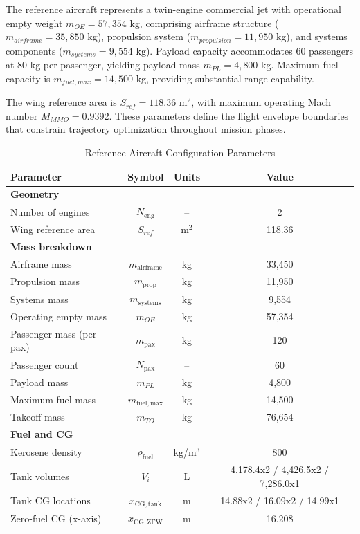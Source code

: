 
The reference aircraft represents a twin-engine commercial jet with operational empty weight $m_{OE} = 57,354$ kg, comprising airframe structure ($m_{airframe} = 35,850$ kg), propulsion system ($m_{propulsion} = 11,950$ kg), and systems components ($m_{systems} = 9,554$ kg). Payload capacity accommodates 60 passengers at 80 kg per passenger, yielding payload mass $m_{PL} = 4,800$ kg. Maximum fuel capacity is $m_{fuel,max} = 14,500$ kg, providing substantial range capability.

The wing reference area is $S_{ref} = 118.36$ m$^2$, with maximum operating Mach number $M_{MMO} = 0.9392$. These parameters define the flight envelope boundaries that constrain trajectory optimization throughout mission phases.

 \begin{table}[h]
    \centering
    \footnotesize
    \caption{Reference Aircraft Configuration Parameters}
    \begin{tabular}{l c c c}
        \hline
        Parameter & Symbol & Units & Value \\
        \hline
        \textbf{Geometry} & & & \\
        Number of engines & $N_{\mathrm{eng}}$ & -- & 2 \\
        Wing reference area & $S_{ref}$ & m$^2$ & 118.36 \\
        \hline
        \textbf{Mass breakdown} & & & \\
        Airframe mass & $m_{\mathrm{airframe}}$ & kg & 33{,}450 \\
        Propulsion mass & $m_{\mathrm{prop}}$ & kg & 11{,}950 \\
        Systems mass & $m_{\mathrm{systems}}$ & kg & 9{,}554 \\
        Operating empty mass & $m_{OE}$ & kg & 57{,}354 \\
        Passenger mass (per pax) & $m_{\mathrm{pax}}$ & kg & 120 \\
        Passenger count & $N_{\mathrm{pax}}$ & -- & 60 \\
        Payload mass & $m_{PL}$ & kg & 4{,}800 \\
        Maximum fuel mass & $m_{\mathrm{fuel,max}}$ & kg & 14{,}500 \\
        Takeoff mass & $m_{TO}$ & kg & 76{,}654 \\

        \hline
        \textbf{Fuel and CG} & & & \\
        Kerosene density & $\rho_{\mathrm{fuel}}$ & kg/m$^3$ & 800 \\
        Tank volumes & $V_{i}$ & L & 4{,}178.4x2 / 4{,}426.5x2 / 7{,}286.0x1 \\
        Tank CG locations & $x_{\mathrm{CG,tank}}$ & m & 14.88x2 / 16.09x2 / 14.99x1 \\
        Zero-fuel CG (x-axis) & $x_{\mathrm{CG,ZFW}}$ & m & 16.208 \\
        \hline
    \end{tabular}
\end{table}